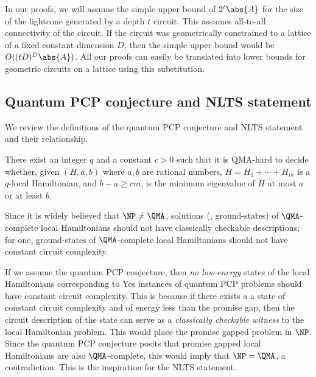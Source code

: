 \documentclass{toc}
\begin{document}
In our proofs, we will assume the simple upper bound of $2^t \abs{A}$ for the size of the lightcone generated by a depth $t$ circuit. This assumes all-to-all connectivity of the circuit. If the circuit was geometrically constrained to a lattice of a fixed constant dimension $D$, then the simple upper bound would be $O((tD )^D \abs{A})$. All our proofs can easily be translated into lower bounds for geometric circuits on a lattice using this substitution.


\subsection{Quantum PCP conjecture and NLTS statement}

We review the definitions of the quantum PCP conjecture and NLTS statement and their relationship.

%
%
%
%
%
%

\begin{conjecture}
There exist an integer $q$ and a constant $c > 0$ such that it is QMA-hard to decide
whether, given $(H,a,b)$ where $a,b$ are rational numbers,
$H = H_1 + \cdots + H_m$ is a $q$-local Hamiltonian, and $b-a\ge cm$,
is the minimum eigenvalue of $H$ at most $a$ or at least $b$.
\end{conjecture}

%
%
%
%
%

Since %
it is widely believed that $\NP \neq \QMA$, solutions (\ie, ground-states) of $\QMA$-complete local Hamiltonians should not have classically checkable descriptions; for one, ground-states of $\QMA$-complete local Hamiltonians should not have constant circuit complexity. 

If we assume the quantum PCP conjecture, then
%
%
%
%
\emph{no low-energy} states of the local Hamiltonians corresponding to Yes instances of quantum
PCP problems should have constant circuit complexity.  %
%
This is because if there exists a %
%
a state of constant circuit complexity and  %
of energy less than the promise gap, then the circuit description of the state can serve as a \emph{classically checkable witness} to the local Hamiltonian problem. This would place the promise gapped problem in $\NP$. Since the quantum PCP conjecture posits that promise gapped local Hamiltonians are also $\QMA$-complete, this would imply that $\NP = \QMA$, a contradiction. This is the inspiration for the NLTS statement.
\end{document}
